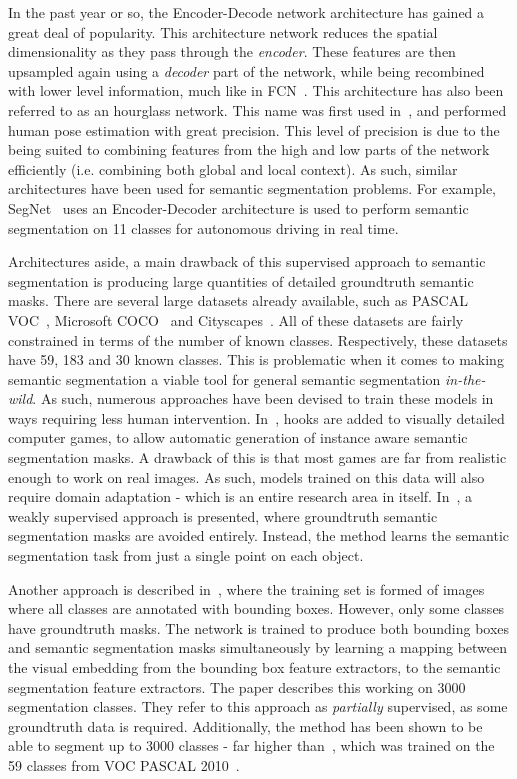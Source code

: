 In the past year or so, the Encoder-Decode network architecture has
gained a great deal of popularity. This architecture network reduces
the spatial dimensionality as they pass through the
\textit{encoder}. These features are then upsampled again using a
\textit{decoder} part of the network, while being recombined with
lower level information, much like in FCN~\cite{long2015fully}. This
architecture has also been referred to as an hourglass network. This
name was first used in~\cite{newell2016stacked}, and performed human
pose estimation with great precision. This level of precision is due
to the being suited to combining features from the high and low parts
of the network efficiently (i.e. combining both global and local
context). As such, similar architectures have been used for semantic
segmentation problems. For example,
SegNet~\cite{badrinarayanan2017segnet} uses an Encoder-Decoder
architecture is used to perform semantic segmentation on 11 classes
for autonomous driving in real time.

Architectures aside, a main drawback of this supervised approach to
semantic segmentation is producing large quantities of detailed
groundtruth semantic masks. There are several large datasets already
available, such as PASCAL VOC~\cite{everingham2010pascal}, Microsoft
COCO~\cite{lin2014microsoft} and
Cityscapes~\cite{cordts2016cityscapes}. All of these datasets are
fairly constrained in terms of the number of known
classes. Respectively, these datasets have 59, 183 and 30 known
classes. This is problematic when it comes to making semantic
segmentation a viable tool for general semantic segmentation
\textit{in-the-wild}. As such, numerous approaches have been devised
to train these models in ways requiring less human
intervention. In~\cite{richter2016playing}, hooks are added to
visually detailed computer games, to allow automatic generation of
instance aware semantic segmentation masks. A drawback of this is that
most games are far from realistic enough to work on real images. As
such, models trained on this data will also require domain adaptation
- which is an entire research area in itself. In~\cite{bearman2016s},
a weakly supervised approach is presented, where groundtruth semantic
segmentation masks are avoided entirely. Instead, the method learns
the semantic segmentation task from just a single point on each
object.

Another approach is described in~\cite{hu2018learning}, where the
training set is formed of images where all classes are annotated with
bounding boxes. However, only some classes have groundtruth masks. The
network is trained to produce both bounding boxes and semantic
segmentation masks simultaneously by learning a mapping between the
visual embedding from the bounding box feature extractors, to the
semantic segmentation feature extractors. The paper describes this
working on 3000 segmentation classes. They refer to this approach as
\textit{partially} supervised, as some groundtruth data is
required. Additionally, the method has been shown to be able to
segment up to 3000 classes - far higher than~\cite{long2015fully},
which was trained on the 59 classes from VOC PASCAL
2010~\cite{everingham2010pascal}.

